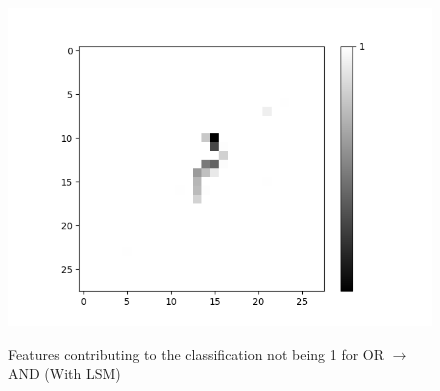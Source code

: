 \begin{minipage}[t]{0.5\textwidth}
\begin{figure}[H]
\begin{minipage}[b]{0.32\textwidth}
			\includegraphics[width=\textwidth]{OR-AND(W-LSM)(1)/DontLike/False/Layer0-Neuron-28.png}
			\label{}
		\end{minipage}
			\caption{Features contributing to the classification not being 1 for OR $\rightarrow$ AND (With LSM)}
			\label{fig:or-and-with-lsm-neg}
			\hfill
	\end{figure}

\end{minipage}
\hspace{0.05\textwidth}
